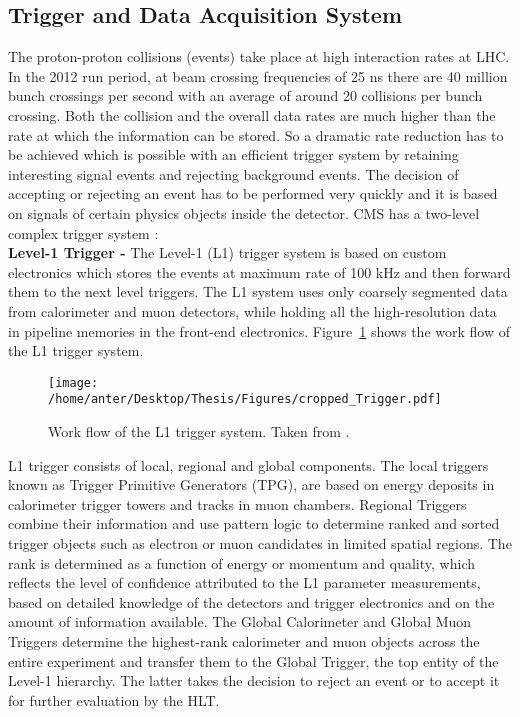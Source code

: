 \subsection{Trigger and Data Acquisition System}
The proton-proton collisions (events) take place at high interaction rates at LHC. In the 2012 run period, at beam crossing frequencies of 25 ns there are 40 million bunch crossings per second with an average of around 20 collisions per bunch crossing. Both the collision and the overall data rates are much higher than the rate at which the information can be stored. So a dramatic rate reduction has to be achieved which is possible with an efficient trigger system by retaining interesting signal events and rejecting background events. The decision of accepting or rejecting an event has to be performed very quickly and it is based on signals of certain physics objects inside the detector.
CMS has a two-level complex trigger system : \\\newline
{\bf Level-1 Trigger -} The Level-1 (L1) trigger system is based on custom electronics which stores the events at maximum rate of 100 kHz and then forward them to the next level triggers. The L1 system uses only coarsely segmented data from calorimeter and muon detectors, while holding all the high-resolution data in pipeline memories in the front-end electronics. Figure~\ref{fig:L1} shows the work flow of the L1 trigger system. 
\begin{figure}[!h]
\begin{center}
\vspace*{3mm} 
\hspace*{-5mm}
\texttt{[image: /home/anter/Desktop/Thesis/Figures/cropped\_Trigger.pdf]}\\
\vspace*{4mm}
\caption{Work flow of the L1 trigger system. Taken from \cite{Chatrchyan:2008aa}.}
\label{fig:L1}
\end{center}
\end{figure}
L1 trigger consists of local, regional and global components. The local triggers known as Trigger Primitive Generators (TPG), are based on energy deposits in calorimeter trigger towers and tracks in muon chambers. Regional Triggers combine their information and use pattern logic to determine ranked and sorted trigger objects such as electron or muon candidates in limited spatial regions. The rank is determined as a function of energy or momentum and quality, which reflects the level of confidence attributed to the L1 parameter measurements, based on detailed knowledge of the detectors and trigger electronics and on the amount of information available. The Global Calorimeter and Global Muon Triggers determine the highest-rank calorimeter and muon objects across the entire experiment and transfer them to the Global Trigger, the top entity of the Level-1 hierarchy. The latter takes the decision to reject an event or to accept it for further evaluation by the HLT. \\\newline
